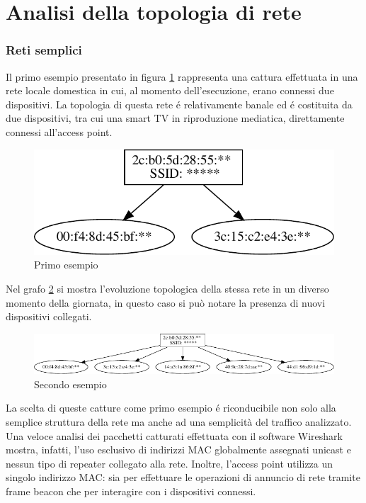 \newpage 
\section{Analisi della topologia di rete}
\subsubsection{Reti semplici}

Il primo esempio presentato in figura \ref{fig:es1} rappresenta una cattura effettuata in una rete locale domestica in cui, al momento dell'esecuzione, erano connessi due dispositivi.
La topologia di questa rete \'e relativamente banale ed \'e costituita da due dispositivi, tra cui una smart TV in riproduzione mediatica, direttamente connessi all'access point.

\begin{figure}[!h]
	\centering
	\includegraphics{images/img8censored.pdf}
	\caption{Primo esempio}
	\label{fig:es1}
\end{figure}


Nel grafo \ref{fig:es2} si mostra l'evoluzione topologica della stessa rete in un diverso momento della giornata, in questo caso si pu\`o notare la presenza di nuovi dispositivi collegati.
\begin{figure}[!h]
	\centering
	\includegraphics{images/img9censored.pdf}
	\caption{Secondo esempio}
	\label{fig:es2}
\end{figure}

La scelta di queste catture come primo esempio \'e riconducibile non solo alla semplice struttura della rete ma anche ad una semplicit\`a del traffico analizzato.
Una veloce analisi dei pacchetti catturati effettuata con il software Wireshark mostra, infatti, l'uso esclusivo di indirizzi MAC globalmente assegnati unicast e nessun tipo di repeater collegato alla rete.
Inoltre, l'access point utilizza un singolo indirizzo MAC: sia per effettuare le operazioni di annuncio di rete tramite frame beacon che per interagire con i dispositivi connessi.

